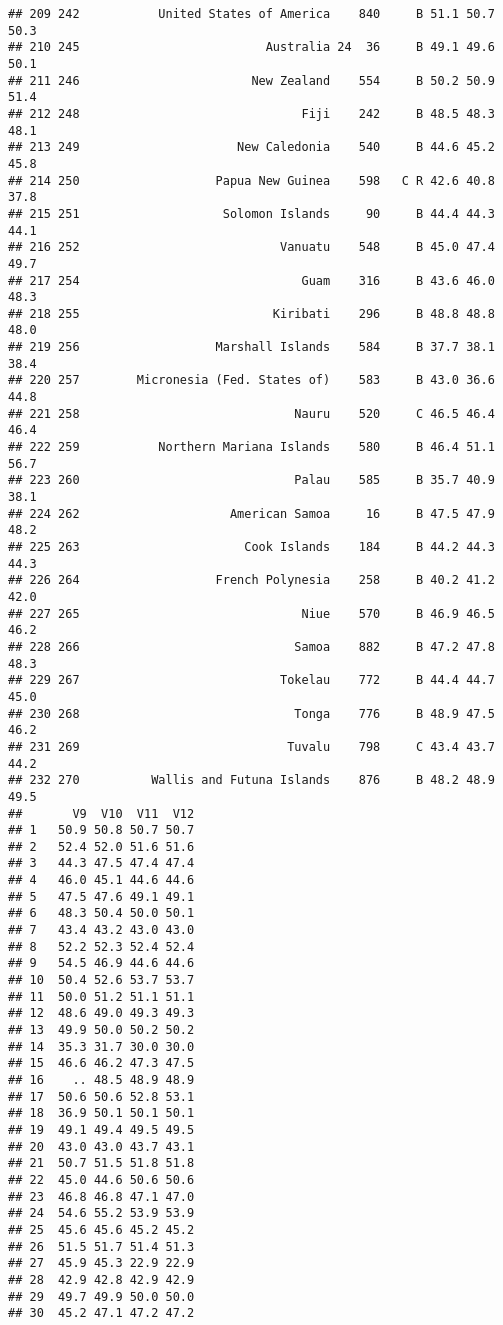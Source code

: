 \documentclass[]{article}
\begin{document}
\begin{verbatim}
## 209 242           United States of America    840     B 51.1 50.7 50.3
## 210 245                          Australia 24  36     B 49.1 49.6 50.1
## 211 246                        New Zealand    554     B 50.2 50.9 51.4
## 212 248                               Fiji    242     B 48.5 48.3 48.1
## 213 249                      New Caledonia    540     B 44.6 45.2 45.8
## 214 250                   Papua New Guinea    598   C R 42.6 40.8 37.8
## 215 251                    Solomon Islands     90     B 44.4 44.3 44.1
## 216 252                            Vanuatu    548     B 45.0 47.4 49.7
## 217 254                               Guam    316     B 43.6 46.0 48.3
## 218 255                           Kiribati    296     B 48.8 48.8 48.0
## 219 256                   Marshall Islands    584     B 37.7 38.1 38.4
## 220 257        Micronesia (Fed. States of)    583     B 43.0 36.6 44.8
## 221 258                              Nauru    520     C 46.5 46.4 46.4
## 222 259           Northern Mariana Islands    580     B 46.4 51.1 56.7
## 223 260                              Palau    585     B 35.7 40.9 38.1
## 224 262                     American Samoa     16     B 47.5 47.9 48.2
## 225 263                       Cook Islands    184     B 44.2 44.3 44.3
## 226 264                   French Polynesia    258     B 40.2 41.2 42.0
## 227 265                               Niue    570     B 46.9 46.5 46.2
## 228 266                              Samoa    882     B 47.2 47.8 48.3
## 229 267                            Tokelau    772     B 44.4 44.7 45.0
## 230 268                              Tonga    776     B 48.9 47.5 46.2
## 231 269                             Tuvalu    798     C 43.4 43.7 44.2
## 232 270          Wallis and Futuna Islands    876     B 48.2 48.9 49.5
##       V9  V10  V11  V12
## 1   50.9 50.8 50.7 50.7
## 2   52.4 52.0 51.6 51.6
## 3   44.3 47.5 47.4 47.4
## 4   46.0 45.1 44.6 44.6
## 5   47.5 47.6 49.1 49.1
## 6   48.3 50.4 50.0 50.1
## 7   43.4 43.2 43.0 43.0
## 8   52.2 52.3 52.4 52.4
## 9   54.5 46.9 44.6 44.6
## 10  50.4 52.6 53.7 53.7
## 11  50.0 51.2 51.1 51.1
## 12  48.6 49.0 49.3 49.3
## 13  49.9 50.0 50.2 50.2
## 14  35.3 31.7 30.0 30.0
## 15  46.6 46.2 47.3 47.5
## 16    .. 48.5 48.9 48.9
## 17  50.6 50.6 52.8 53.1
## 18  36.9 50.1 50.1 50.1
## 19  49.1 49.4 49.5 49.5
## 20  43.0 43.0 43.7 43.1
## 21  50.7 51.5 51.8 51.8
## 22  45.0 44.6 50.6 50.6
## 23  46.8 46.8 47.1 47.0
## 24  54.6 55.2 53.9 53.9
## 25  45.6 45.6 45.2 45.2
## 26  51.5 51.7 51.4 51.3
## 27  45.9 45.3 22.9 22.9
## 28  42.9 42.8 42.9 42.9
## 29  49.7 49.9 50.0 50.0
## 30  45.2 47.1 47.2 47.2

\end{verbatim}
\end{document}
